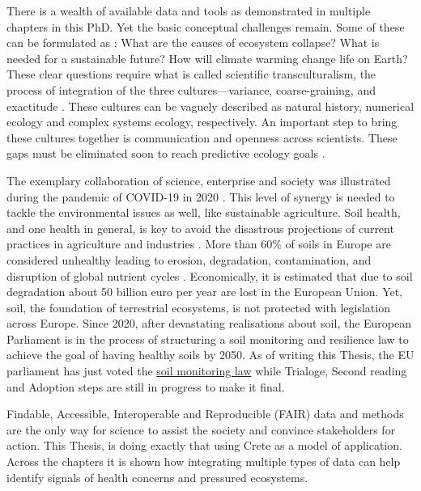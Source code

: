 There is a wealth of available data and tools as demonstrated in 
multiple chapters in this PhD. Yet the basic conceptual challenges remain. 
Some of these can be formulated as : What are the causes of ecosystem collapse?
What is needed for a sustainable future?
How will climate warming change life on Earth?
These clear questions require what is called scientific transculturalism,
the process of integration of the three cultures—variance, coarse-graining, and exactitude \parencite{Enquist_2024}.
These cultures can be vaguely described as natural history, numerical ecology and complex systems ecology, respectively.
An important step to bring these cultures together is communication and openness across scientists.
These gaps must be eliminated soon to reach predictive ecology goals \parencite{mouquet_review_2015}.

The exemplary collaboration of science, enterprise and society was
illustrated during the pandemic of COVID-19 in 2020 \parencite{ioannidis2021the-rapid,lee2021scientific}. 
This level of synergy is needed to tackle the environmental issues
as well, like sustainable agriculture. Soil health,
and one health in general, is key to avoid the disastrous projections of
current practices in agriculture and industries \parencite{banerjee2023Soil}.
More than 60\% of
soils in Europe are considered unhealthy leading to erosion, degradation, contamination,
and disruption of global nutrient cycles \parencite{commission2020caring}.
Economically, it is estimated that due to soil degradation about 50 billion euro per year
are lost in the European Union. 
Yet, soil, the foundation of 
terrestrial ecosystems, is not protected with legislation across Europe.
Since 2020, after devastating realisations about soil, the European Parliament 
is in the process of structuring a soil monitoring and resilience law to achieve 
the goal of having healthy soils by 2050. As of writing this Thesis, the EU 
parliament has just voted the \href{https://www.europarl.europa.eu/thinktank/en/document/EPRS_BRI(2024)757627}{soil monitoring law}
while Trialoge, Second reading and Adoption steps are still in progress to make it final.

Findable, Accessible, Interoperable and Reproducible (FAIR) data and methods
are the only way for science to assist the society and convince stakeholders for action. 
This Thesis, is doing exactly that using Crete as a model of application. Across the chapters it is shown how 
integrating multiple types of data can help identify signals of health concerns and 
pressured ecosystems.
